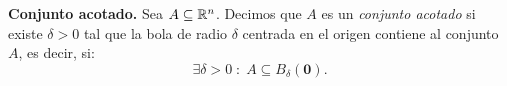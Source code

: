 \begin{definition} \textbf{Conjunto acotado.} \label{def:conj_acotado}
    Sea $A \subseteq \mathbb{R}^n$. Decimos que $A$ es un \emph{conjunto acotado} si existe $\delta > 0$ tal que la bola de radio $\delta$ centrada en el origen contiene al conjunto $A$, es decir, si:
    \[
     \exists \delta > 0 \; \colon \; A \subseteq B_{\delta}(\mathbf{0}).
    \]
\end{definition}
  



